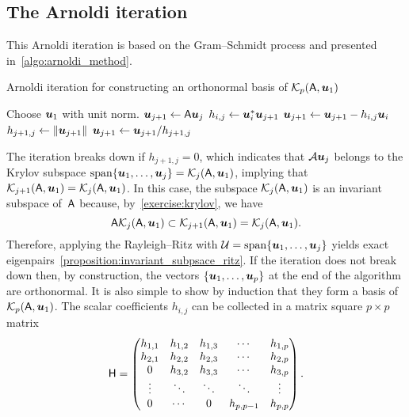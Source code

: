 \subsection{The Arnoldi iteration}
This Arnoldi iteration is based on the Gram--Schmidt process and presented in~\cref{algo:arnoldi_method}.
\begin{algorithm}
\caption{Arnoldi iteration for constructing an orthonormal basis of $\mathcal K_p(\mathsf A, \mathbf{\boldsymbol{u}}_1)$}%
\label{algo:arnoldi_method}%
\begin{algorithmic}
\State Choose $\mathbf{\boldsymbol{u}}_1$ with unit norm.
    \State $\mathbf{\boldsymbol{u}}_{j+1} \gets \mathsf A \mathbf{\boldsymbol{u}}_{j}$
        \State $h_{i,j} \gets \mathbf{\boldsymbol{u}}_{i}^* \mathbf{\boldsymbol{u}}_{j+1}$
        \State $\mathbf{\boldsymbol{u}}_{j+1} \gets \mathbf{\boldsymbol{u}}_{j+1} - h_{i,j} \mathbf{\boldsymbol{u}}_{i}$
    \EndFor
    \State $h_{j+1,j} \gets \lVert\mathbf{\boldsymbol{u}}_{j+1}\rVert$
    \State $\mathbf{\boldsymbol{u}}_{j+1} \gets \mathbf{\boldsymbol{u}}_{j+1} / h_{j+1,j}$
\EndFor
\end{algorithmic}
\end{algorithm}
The iteration breaks down if $h_{j+1,j} = 0$,
which indicates that $\mathcal A \mathbf{\boldsymbol{u}}_j$ belongs to the Krylov subspace $\operatorname{span} \{ \mathbf{\boldsymbol{u}}_1, \dotsc, \mathbf{\boldsymbol{u}}_j \} = \mathcal K_j(\mathsf A, \mathbf{\boldsymbol{u}}_1)$,
implying that $\mathcal K_{j+1}(\mathsf A, \mathbf{\boldsymbol{u}}_1) = \mathcal K_j(\mathsf A, \mathbf{\boldsymbol{u}}_1)$.
In this case, the subspace $\mathcal K_j(\mathsf A, \mathbf{\boldsymbol{u}}_1)$ is an invariant subspace of~$\mathsf A$ because, by~\cref{exercise:krylov},
we have
\[
    \mathsf A \mathcal K_j(\mathsf A, \mathbf{\boldsymbol{u}}_1)
    \subset \mathcal K_{j+1}(\mathsf A, \mathbf{\boldsymbol{u}}_1)
    = \mathcal K_j(\mathsf A, \mathbf{\boldsymbol{u}}_1).
\]
Therefore, applying the Rayleigh--Ritz with $\mathcal U = \operatorname{span} \{ \mathbf{\boldsymbol{u}}_1, \dotsc, \mathbf{\boldsymbol{u}}_j \}$ yields exact eigenpairs~\cref{proposition:invariant_subpsace_ritz}.
If the iteration does not break down then,
by construction,
the vectors $\{\mathbf{\boldsymbol{u}}_1, \dotsc, \mathbf{\boldsymbol{u}}_p\}$ at the end of the algorithm are orthonormal.
It is also simple to show by induction that they form a basis of~$\mathcal K_p(\mathsf A, \mathbf{\boldsymbol{u}}_1)$.
The scalar coefficients $h_{i,j}$ can be collected in a matrix square $p \times p$ matrix
\[
    \mathsf H
    =
    \begin{pmatrix}
        h_{1,1} & h_{1,2} & h_{1,3} & \cdots  & h_{1,p} \\
        h_{2,1} & h_{2,2} & h_{2,3} & \cdots  & h_{2,p} \\
        0       & h_{3,2} & h_{3,3} & \cdots  & h_{3,p} \\
        \vdots  & \ddots  & \ddots  & \ddots  & \vdots  \\
        0       & \cdots  & 0     & h_{p,p-1} & h_{p,p}
    \end{pmatrix}.
\]
